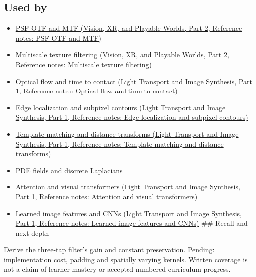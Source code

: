 \subsection{Used by}\label{appendix-d5b3c692d9f0-used-by}

\hypertarget{appendix-d5b3c692d9f0-used-by}{}

\begin{itemize}
\item
  \href{../07-Vision-XR-and-Playable-Worlds-P02/main.pdf\#appendix-8b76b0efd27f}{PSF OTF and MTF (Vision, XR, and Playable Worlds, Part 2, Reference notes: PSF OTF and MTF)}
\item
  \href{../07-Vision-XR-and-Playable-Worlds-P02/main.pdf\#appendix-b677a85ba76f}{Multiscale texture filtering (Vision, XR, and Playable Worlds, Part 2, Reference notes: Multiscale texture filtering)}
\item
  \href{../04-Light-Transport-and-Image-Synthesis-P01/main.pdf\#appendix-e2e73f8cd93e}{Optical flow and time to contact (Light Transport and Image Synthesis, Part 1, Reference notes: Optical flow and time to contact)}
\item
  \href{../04-Light-Transport-and-Image-Synthesis-P01/main.pdf\#appendix-36022286b03e}{Edge localization and subpixel contours (Light Transport and Image Synthesis, Part 1, Reference notes: Edge localization and subpixel contours)}
\item
  \href{../04-Light-Transport-and-Image-Synthesis-P01/main.pdf\#appendix-5fb4af80d1c7}{Template matching and distance transforms (Light Transport and Image Synthesis, Part 1, Reference notes: Template matching and distance transforms)}
\item
  \hyperref[appendix-1988d465c119]{PDE fields and discrete Laplacians}
\item
  \href{../04-Light-Transport-and-Image-Synthesis-P01/main.pdf\#appendix-a9d5dfdd164a}{Attention and visual transformers (Light Transport and Image Synthesis, Part 1, Reference notes: Attention and visual transformers)}
\item
  \href{../04-Light-Transport-and-Image-Synthesis-P01/main.pdf\#appendix-47c51ea026fb}{Learned image features and CNNs (Light Transport and Image Synthesis, Part 1, Reference notes: Learned image features and CNNs)} \#\# Recall and next depth
\end{itemize}

Derive the three-tap filter's gain and constant preservation. Pending: implementation cost, padding and spatially varying kernels. Written coverage is not a claim of learner mastery or accepted numbered-curriculum progress.


